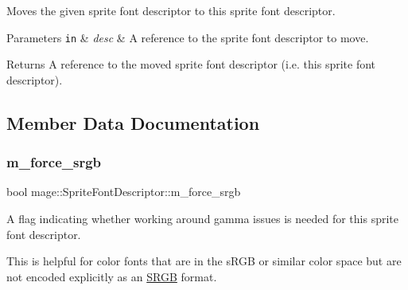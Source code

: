 Moves the given sprite font descriptor to this sprite font descriptor.


\begin{DoxyParams}[1]{Parameters}
\mbox{\tt in}  & {\em desc} & A reference to the sprite font descriptor to move. \\
\hline
\end{DoxyParams}
\begin{DoxyReturn}{Returns}
A reference to the moved sprite font descriptor (i.\+e. this sprite font descriptor). 
\end{DoxyReturn}


\subsection{Member Data Documentation}
\hypertarget{classmage_1_1_sprite_font_descriptor_a7fa7230004e671127856e2ab1c27c94a}{}\label{classmage_1_1_sprite_font_descriptor_a7fa7230004e671127856e2ab1c27c94a} 
\subsubsection{\texorpdfstring{m\+\_\+force\+\_\+srgb}{m\_force\_srgb}}
{\footnotesize\ttfamily bool mage\+::\+Sprite\+Font\+Descriptor\+::m\+\_\+force\+\_\+srgb\hspace{0.3cm}{\ttfamily [private]}}

A flag indicating whether working around gamma issues is needed for this sprite font descriptor.

This is helpful for color fonts that are in the s\+R\+GB or similar color space but are not encoded explicitly as an \hyperlink{structmage_1_1_s_r_g_b}{S\+R\+GB} format. 